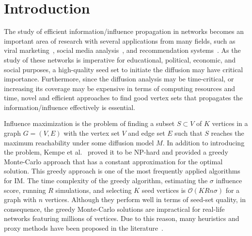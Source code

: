 \documentclass[10pt,journal,compsoc]{IEEEtran}
\begin{document}
\maketitle

\IEEEdisplaynontitleabstractindextext
\IEEEpeerreviewmaketitle


\ifCLASSOPTIONcompsoc
{}
\else
\section{Introduction}
\label{sec:introduction}
\fi

The study of efficient information/influence propagation in networks becomes an important area of research with several applications from many fields, such as viral marketing~\cite{leskovec2007dynamics, trusov2009effects}, social media analysis~\cite{zeng2010social, moreno2004dynamics}, and recommendation systems~\cite{lu2012recommender}.
As the study of these networks is imperative for educational, political, economic, and social purposes, a high-quality seed set to initiate the diffusion may have critical importance.
Furthermore, since the diffusion analysis may be time-critical, or increasing its coverage may be expensive in terms of computing resources and time, novel and efficient approaches to find good vertex sets that propagates the information/influence effectively is essential.

Influence maximization is the problem of finding a subset $S \subset V$ of $K$ vertices in a graph $G = (V, E)$ with the vertex set $V$ and edge set $E$ such that $S$ reaches the maximum reachability under some diffusion model $M$. In addition to introducing the problem, Kempe et al.~\cite{kempe2003maximizing} proved it to be NP-hard and provided a greedy Monte-Carlo approach that has a constant approximation for the optimal solution. This greedy approach is one of the most frequently applied algorithms for IM. The time complexity of the greedy algorithm, estimating the $\sigma$ influence score, running $R$ simulations, and selecting $K$ seed vertices is $\mathcal{O}(KRn\sigma)$ for a graph with $n$ vertices. Although they perform well in terms of seed-set quality, in consequence, the greedy Monte-Carlo solutions are impractical for real-life networks featuring millions of vertices. Due to this reason, many heuristics and proxy methods have been proposed in the literature~\cite{MixGreedy, narayanam2010shapley, kimura2007extracting, chen2010PMIA,chen2010LDAG, kim2013scalable, cohen2014sketch, goyal2011simpath, jung2012irie,cheng2014imrank,liu2014influence,galhotra2016holistic}.
\end{document}
